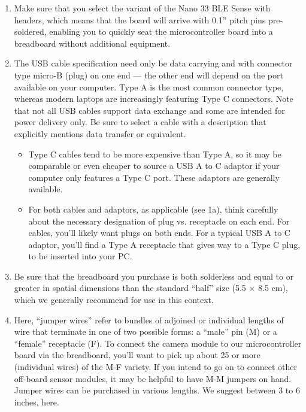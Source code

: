 \begin{enumerate}
  \item Make sure that you select the variant of the Nano 33 BLE Sense with headers, which means that the board will arrive with 0.1” pitch pins pre-soldered, enabling you to quickly seat the microcontroller board into a breadboard without additional equipment.
  \item The USB cable specification need only be data carrying and with connector type micro-B (plug) on one end — the other end will depend on the port available on your computer. Type A is the most common connector type, whereas modern laptops are increasingly featuring Type C connectors. Note that not all USB cables support data exchange and some are intended for power delivery only. Be sure to select a cable with a description that explicitly mentions data transfer or equivalent.
    \begin{itemize}
      \item Type C cables tend to be more expensive than Type A, so it may be comparable or even cheaper to source a USB A to C adaptor if your computer only features a Type C port. These adaptors are generally available.
      \item For both cables and adaptors, as applicable (see 1a), think carefully about the necessary designation of plug vs. receptacle on each end. For cables, you’ll likely want plugs on both ends. For a typical USB A to C adaptor, you’ll find a Type A receptacle that gives way to a Type C plug, to be inserted into your PC.
    \end{itemize}
  \item Be sure that the breadboard you purchase is both solderless and equal to or greater in spatial dimensions than the standard ``half'' size (5.5 $\times$ 8.5 cm), which we generally recommend for use in this context.
  \item Here, ``jumper wires'' refer to bundles of adjoined or individual lengths of wire that terminate in one of two possible forms: a ``male'' pin (M) or a ``female'' receptacle (F). To connect the camera module to our microcontroller board via the breadboard, you'll want to pick up about 25 or more (individual wires) of the M-F variety. If you intend to go on to connect other off-board sensor modules, it may be helpful to have M-M jumpers on hand. Jumper wires can be purchased in various lengths. We suggest between 3 to 6 inches, here.

\end{enumerate}
